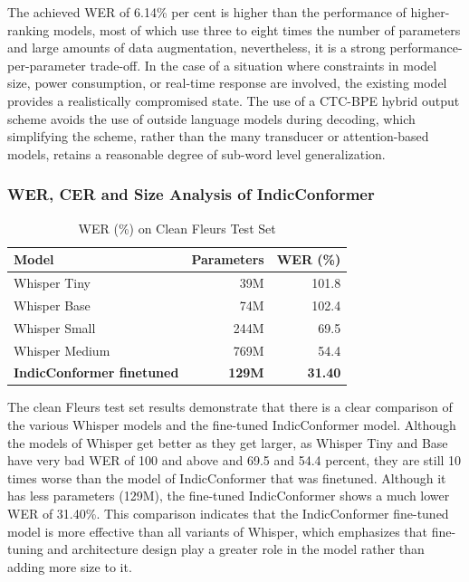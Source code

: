 The achieved WER of 6.14\% per cent is higher than the performance of higher-ranking models, most of which use three to eight times the number of parameters and large amounts of data augmentation, nevertheless, it is a strong performance-per-parameter trade-off. In the case of a situation where constraints in model size, power consumption, or real-time response are involved, the existing model provides a realistically compromised state. The use of a CTC-BPE hybrid output scheme avoids the use of outside language models during decoding, which simplifying the scheme, rather than the many transducer or attention-based models, retains a reasonable degree of sub-word level generalization.

\subsubsection{WER, CER and Size Analysis of IndicConformer}
 
\begin{table}[H]
\centering
\begin{tabular}{|l|r|r|}
\hline
\textbf{Model} & \textbf{Parameters} & \textbf{WER (\%)} \\
\hline
Whisper Tiny & 39M & 101.8 \\
Whisper Base & 74M & 102.4 \\
Whisper Small & 244M & 69.5 \\
Whisper Medium & 769M & 54.4 \\
\textbf{IndicConformer finetuned } & \textbf{129M} & \textbf{31.40} \\
\hline
\end{tabular}
\caption{WER (\%) on Clean Fleurs Test Set}
\label{tab:clean_wer}
\end{table}
The clean Fleurs test set results demonstrate that there is a clear comparison of the various Whisper models and the fine-tuned IndicConformer model. Although the models of Whisper get better as they get larger, as Whisper Tiny and Base have very bad WER of 100 and above and 69.5 and 54.4 percent, they are still 10 times worse than the model of IndicConformer that was finetuned. Although it has less parameters (129M), the fine-tuned IndicConformer shows a much lower WER of 31.40\%. This comparison indicates that the IndicConformer fine-tuned model is more effective than all variants of Whisper, which emphasizes that fine-tuning and architecture design play a greater role in the model rather than adding more size to it.

